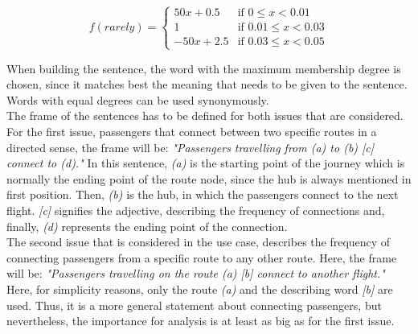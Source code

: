 \documentclass[conference]{IEEEtran}
\begin{document}
\begin{equation}
f(rarely)= \begin{cases}
50x + 0.5 & \text{if } 0 \leqslant x < 0.01\\
1 & \text{if } 0.01 \leqslant x < 0.03\\
-50x + 2.5 & \text{if } 0.03 \leqslant x < 0.05
\end{cases}
\end{equation}

When building the sentence, the word with the maximum membership degree is chosen, since it matches best the meaning that needs to be given to the sentence. Words with equal degrees can be used synonymously.\\
The frame of the sentences has to be defined for both issues that are considered. For the first issue, passengers that connect between two specific routes in a directed sense, the frame will be: \newline \emph{"Passengers travelling from (a) to (b) [c] connect to (d)."} \newline In this sentence, \emph{(a)} is the starting point of the journey which is normally the ending point of the route node, since the hub is always mentioned in first position. Then, \emph{(b)} is the hub, in which the passengers connect to the next flight. \emph{[c]} signifies the adjective, describing the frequency of connections and, finally, \emph{(d)} represents the ending point of the connection.\\
The second issue that is considered in the use case, describes the frequency of connecting passengers from a specific route to any other route. Here, the frame will be: \newline \emph{"Passengers travelling on the route (a) [b] connect to another flight."} \newline Here, for simplicity reasons, only the route \emph{(a)} and the describing word \emph{[b]} are used. Thus, it is a more general statement about connecting passengers, but nevertheless, the importance for analysis is at least as big as for the first issue.
\end{document}
